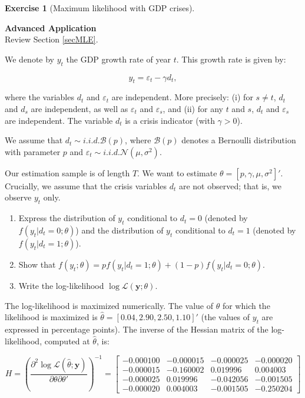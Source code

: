 \documentclass[
  11pt,
]{book}
\theoremstyle{definition}
\theoremstyle{definition}
\theoremstyle{definition}
\newtheorem{exercise}{Exercise}[chapter]
\theoremstyle{definition}
\theoremstyle{remark}
\begin{document}
\begin{exercisebox}

\begin{exercise}[Maximum likelihood with GDP crises]
\protect\hypertarget{exr:estimation-gdp-crises}{}\label{exr:estimation-gdp-crises}

\textbf{Advanced \textbar{} Application}\\
Review Section \ref{secMLE}.

We denote by \(y_t\) the GDP growth rate of year \(t\). This growth rate is given by:

\[y_t = \varepsilon_t - \gamma d_t,\]

where the variables \(d_t\) and \(\varepsilon_t\) are independent. More precisely: (i) for \(s \neq t\), \(d_t\) and \(d_s\) are independent, as well as \(\varepsilon_t\) and \(\varepsilon_s\), and (ii) for any \(t\) and \(s\), \(d_t\) and \(\varepsilon_s\) are independent. The variable \(d_t\) is a crisis indicator (with \(\gamma > 0\)).

We assume that \(d_t \sim i.i.d.\mathcal{B}(p)\), where \(\mathcal{B}(p)\) denotes a Bernoulli distribution with parameter \(p\) and \(\varepsilon_t \sim i.i.d.\mathcal{N}(\mu,\sigma^2)\).

Our estimation sample is of length \(T\). We want to estimate \(\theta = [p, \gamma, \mu, \sigma^2]'\). Crucially, we assume that the crisis variables \(d_t\) are not observed; that is, we observe \(y_t\) only.

\begin{enumerate}
\def\labelenumi{\arabic{enumi}.}
\item
  Express the distribution of \(y_t\) conditional to \(d_t = 0\) (denoted by \(f(y_t|d_t = 0; \theta)\)) and the distribution of \(y_t\) conditional to \(d_t = 1\) (denoted by \(f(y_t|d_t = 1; \theta)\)).
\item
  Show that \(f(y_t; \theta) = p f(y_t|d_t = 1; \theta) + (1 - p) f(y_t|d_t = 0; \theta)\).
\item
  Write the log-likelihood \(\log \mathcal{L}(\mathbf{y}; \theta)\).
\end{enumerate}

The log-likelihood is maximized numerically. The value of \(\theta\) for which the likelihood is maximized is \(\hat{\theta} = [0.04, 2.90, 2.50, 1.10]'\) (the values of \(y_t\) are expressed in percentage points). The inverse of the Hessian matrix of the log-likelihood, computed at \(\hat{\theta}\), is:

\[H = \left( \frac{\partial^2 \log \mathcal{L}(\hat{\theta}; \mathbf{y})}{\partial \theta \partial \theta'} \right)^{-1} =
\begin{bmatrix}
-0.000100 & -0.000015 & -0.000025 & -0.000020 \\
-0.000015 & -0.160002 & 0.019996 & 0.004003 \\
-0.000025 & 0.019996 & -0.042056 & -0.001505 \\
-0.000020 & 0.004003 & -0.001505 & -0.250204
\end{bmatrix}\]


\end{exercise}
\end{exercisebox}
\end{document}
